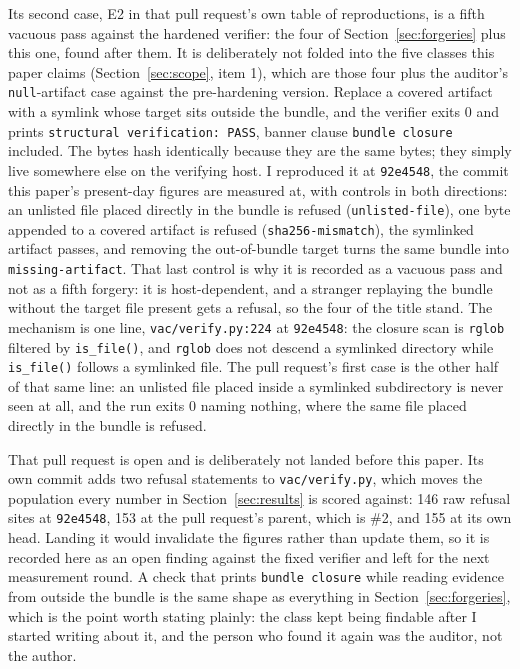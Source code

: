 \documentclass[11pt]{article}
\begin{document}
Its second case, E2 in that pull request's own table of reproductions, is a fifth vacuous
pass against the hardened verifier: the four of
Section~\ref{sec:forgeries} plus this one, found after them. It is deliberately not folded
into the five classes this paper claims (Section~\ref{sec:scope}, item 1), which are those
four plus the auditor's \texttt{null}-artifact case against the pre-hardening version.
Replace a covered artifact with a symlink whose target sits outside the bundle, and the
verifier exits 0 and prints \texttt{structural verification: PASS}, banner clause
\texttt{bundle closure} included. The bytes hash identically because they are the same
bytes; they simply live somewhere else on the verifying host. I reproduced it at
\texttt{92e4548}, the commit this paper's present-day figures are measured at, with controls
in both directions: an unlisted file placed directly in the bundle is refused
(\texttt{unlisted-file}), one byte appended to a covered artifact is refused
(\texttt{sha256-mismatch}), the symlinked artifact passes, and removing the out-of-bundle
target turns the same bundle into \texttt{missing-artifact}. That last control is why it is
recorded as a vacuous pass and not as a fifth forgery: it is host-dependent, and a stranger
replaying the bundle without the target file present gets a refusal, so the four of the
title stand. The mechanism is one line, \texttt{vac/verify.py:224} at \texttt{92e4548}: the
closure scan is \texttt{rglob} filtered by \texttt{is\_file()}, and \texttt{rglob} does not
descend a symlinked directory while \texttt{is\_file()} follows a symlinked file. The pull
request's first case is the other half of that same line: an unlisted file placed inside a
symlinked subdirectory is never seen at all, and the run exits 0 naming nothing, where the
same file placed directly in the bundle is refused.

That pull request is open and is deliberately not landed before this paper. Its own commit
adds two refusal statements to \texttt{vac/verify.py}, which moves the population every
number in Section~\ref{sec:results} is scored against: 146 raw refusal sites at
\texttt{92e4548}, 153 at the pull request's parent, which is \#2, and 155 at its own head.
Landing
it would invalidate the figures rather than update them, so it is recorded here as an open
finding against the fixed verifier and left for the next measurement round. A check that
prints \texttt{bundle closure} while reading evidence from outside the bundle is the same
shape as everything in Section~\ref{sec:forgeries}, which is the point worth stating
plainly: the class kept being findable after I started writing about it, and the person who
found it again was the auditor, not the author.
\end{document}
